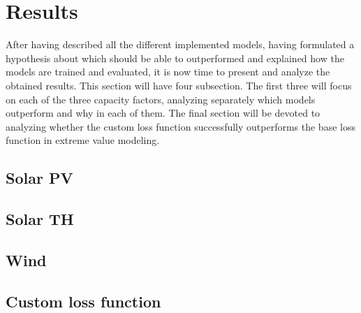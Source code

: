 \section{Results}
After having described all the different implemented models, having formulated a hypothesis about which should be able to outperformed and explained how the models are trained and evaluated, it is now time to present and analyze the obtained results. This section will have four subsection. The first three will focus on each of the three capacity factors, analyzing separately which models outperform and why in each of them. The final section will be devoted to analyzing whether the custom loss function successfully outperforms the base loss function in extreme value modeling. 
\subsection{Solar PV}
\subsection{Solar TH}
\subsection{Wind}
\subsection{Custom loss function}